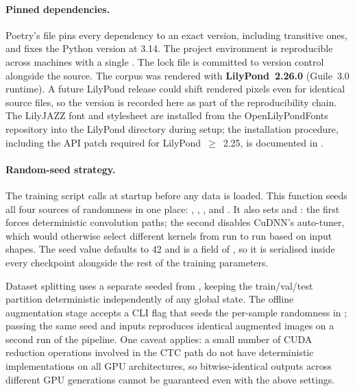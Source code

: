 \paragraph{Pinned dependencies.}
Poetry's  file pins every dependency to an exact
version, including transitive ones, and  fixes
the Python version at \num{3.14}.
The project environment is reproducible across machines with a single
.
The lock file is committed to version control alongside the source.
The corpus was rendered with \textbf{LilyPond~2.26.0} (Guile~3.0
runtime).
A future LilyPond release could shift rendered pixels even for
identical source files, so the version is recorded here as part of
the reproducibility chain.
The LilyJAZZ font and stylesheet are installed from the
OpenLilyPondFonts repository into the LilyPond  directory
during setup; the installation procedure, including the API patch
required for LilyPond~$\geq$~2.25, is documented in
.

\paragraph{Random-seed strategy.}
The training script calls  at
startup before any data is loaded.
This function seeds all four sources of randomness in one place:
, , ,
and .
It also sets  and
: the first forces
deterministic convolution paths; the second disables CuDNN's
auto-tuner, which would otherwise select different kernels from run to
run based on input shapes.
The seed value defaults to \num{42} and is a field of ,
so it is serialised inside every checkpoint alongside the rest of the
training parameters.

Dataset splitting uses a separate  seeded from
, keeping the train/val/test partition deterministic
independently of any global state.
The offline augmentation stage accepts a  CLI flag that
seeds the per-sample randomness in ; passing the
same seed and inputs reproduces identical augmented images on a second
run of the pipeline.
One caveat applies: a small number of CUDA reduction operations
involved in the  CTC path do not have
deterministic implementations on all GPU architectures, so
bitwise-identical outputs across different GPU generations cannot be
guaranteed even with the above settings.

